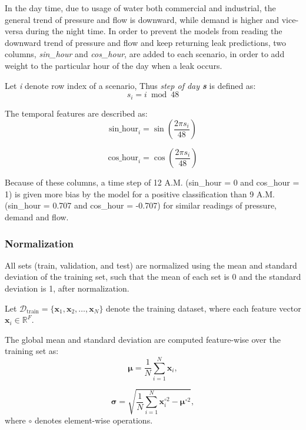 \documentclass[final,5p,times,twocolumn,authoryear]{elsarticle}
\begin{document}
In the day time, due to usage of water both commercial and industrial, the general trend of pressure and flow is downward, while demand is higher and vice-versa during the night time. In order to prevent the models from reading the downward trend of pressure and flow and keep returning leak predictions, two columns, \textit{sin\_hour} and \textit{cos\_hour}, are added to each scenario, in order to add weight to the particular hour of the day when a leak occurs.

Let \textit{i} denote row index of a scenario, Thus \textit{step of day \textbf{s}} is defined as:
\[
s_i = i \bmod 48
\]

The temporal features are described as:
\[
\text{sin\_hour}_i = \sin\!\left( \frac{2\pi s_i}{48} \right)
\]

\[
\text{cos\_hour}_i = \cos\!\left( \frac{2\pi s_i}{48} \right)
\]

Because of these columns, a time step of 12 A.M. (sin\_hour = 0 and cos\_hour = 1) is given more bias by the model for a positive classification than 9 A.M. (sin\_hour = 0.707 and cos\_hour = -0.707) for similar readings of pressure, demand and flow.

\subsubsection{Normalization}

All sets (train, validation, and test) are normalized using the mean and standard deviation of the training set, such that the mean of each set is 0 and the standard deviation is 1, after normalization.

\vspace{0.05cm}

Let $\mathcal{D}_{\text{train}} = \{\mathbf{x}_1, \mathbf{x}_2, \dots, \mathbf{x}_N\}$
denote the training dataset, where each feature vector
$\mathbf{x}_i \in \mathbb{R}^{F}$.

The global mean and standard deviation are computed feature-wise over the
training set as:
\begin{equation}
\boldsymbol{\mu} =
\frac{1}{N} \sum_{i=1}^{N} \mathbf{x}_i,
\end{equation}

\begin{equation}
\boldsymbol{\sigma} =
\sqrt{
\frac{1}{N} \sum_{i=1}^{N} \mathbf{x}_i^{\circ 2}
- \boldsymbol{\mu}^{\circ 2}
},
\end{equation}
where $\circ$ denotes element-wise operations.
\end{document}
